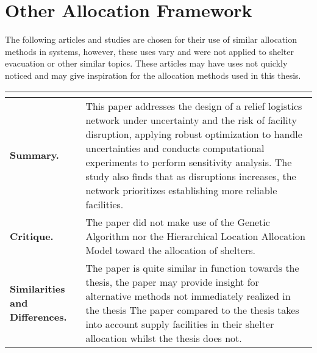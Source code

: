 \section{Other Allocation Framework}

The following articles and studies are chosen for their use of similar allocation methods in systems, however, these uses vary and were not applied to shelter evacuation or other similar topics.  These articles may have uses not quickly noticed and may give inspiration for the allocation methods used in this thesis.

\begin{longtable}{|L{.2\linewidth}|L{.74\linewidth}|}
	\hline
	\\ \hline
	\textbf{Summary.} & This paper addresses the design of a relief logistics network under uncertainty and the risk of facility disruption, applying robust optimization to handle uncertainties and conducts computational experiments to perform sensitivity analysis. The study also finds that as disruptions increases, the network prioritizes establishing more reliable facilities. \\ \hline
	\textbf{Critique.} & The paper did not make use of the Genetic Algorithm nor the Hierarchical Location Allocation Model toward the allocation of shelters. \\ \hline
	\textbf{Similarities and Differences.} & The paper is quite similar in function towards the thesis, the paper may provide insight for alternative methods not immediately realized in the thesis	The paper compared to the thesis takes into account supply facilities in their shelter allocation whilst the thesis does not.\\ \hline
\end{longtable}

